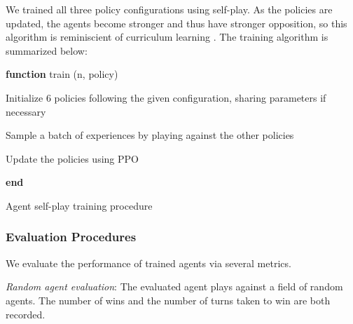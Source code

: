 \documentclass[12pt, a4paper, twocolumn]{article}
\begin{document}
We trained all three policy configurations using self-play. As the policies are updated, the agents become stronger and thus have stronger opposition, so this algorithm is reminiscient of curriculum learning \cite{CurriculumLearning}. The training algorithm is summarized below:




\begin{algorithm}

  \textbf{function} train (n, policy)

  \Indp
  
  
  Initialize 6 policies following the given configuration, sharing parameters if necessary

   {
    Sample a batch of experiences by playing against the other policies

    Update the policies using PPO
  }

  \Indm
  \textbf{end}
  \caption{Agent self-play training procedure}
\end{algorithm}


\subsubsection{Evaluation Procedures}

We evaluate the performance of trained agents via several metrics.

\textit{Random agent evaluation}: The evaluated agent plays against a field of random agents. The number of wins and the number of turns taken to win are both recorded.
\end{document}
